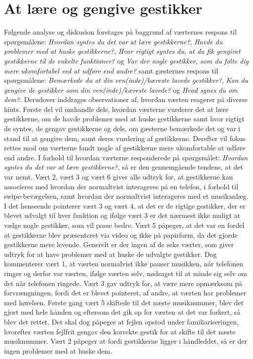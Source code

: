 \section{At lære og gengive gestikker}
\label{TestresultaterSocialAcceptGestikker}
%
Følgende analyse og diskusion foretages på baggrund af værternes respons til spørgsmålene: \textit{Hvordan syntes du det var at lære gestikkerne?}, \textit{Havde du problemer med at huske gestikkerne?}, \textit{Hvor rigtigt syntes du, at du fik gengivet gestikkerne til de enkelte funktioner?} og \textit{Var der nogle gestikker, som du følte dig mere ukomfortabel ved at udføre end andre?} samt gæsternes respons til spørgsmålene: \textit{Bemærkede du at din ven(inde)/kæreste lavede gestikker?}, \textit{Kan du gengive de gestikker som din ven(inde)/kæreste lavede?} og \textit{Hvad synes du om dem?}. Derudover inddrages observationer af, hvordan værten reagerer på diverse hints. Første del vil omhandle dels, hvordan værterne vurderer det at lære gestikkerne, om de havde problemer med at huske gestikkerne samt hvor rigtigt de syntes, de gengav gestikkerne og dels, om gæsterne bemærkede det og var i stand til at gengive dem, samt deres vurdering af gestikkerne. Derefter vil fokus rettes mod om værterne fandt nogle af gestikkerne mere ukomfortable at udføre end andre.\blankline
%
I forhold til hvordan værterne responderede på spørgsmålet: \textit{Hvordan syntes du det var at lære gestikkerne?}, så er den gennemgående tendens, at det var nemt. Vært 2, vært 3 og vært 6 giver alle udtryk for, at gestikkerne kan associeres med hvordan der normaltvist interageres på en telefon, i forhold til swipe-bevægelsen, samt hvordan der normaltvist interageres med et musikanlæg. I det henseende pointerer vært 3 og vært 4, at det er de rigtige gestikker, der er blevet udvalgt til hver funktion og ifølge vært 3 er det nærmest ikke muligt at vælge nogle gestikker, som vil passe bedre. Vært 5 påpeger, at det var en fordel at gestikkerne blev præsenteret via video og ikke på papirform, da det gjorde gestikkerne mere levende. Generelt er der ingen af de seks værter, som giver udtryk for at have problemer med at huske de udvalgte gestikker. Dog kommenterer vært 1, at værten normalvist ikke pauser musikken, når telefonen ringer og derfor var værten, ifølge værten selv, nødsaget til at minde sig selv om det når telefonen ringede. Vært 3 gav udtryk for, at være mere opmærksom på forvrængningen, fordi det er blevet pointeret, af andre, at værten har problemer med hørelsen. Første gang vært 5 skiftede til det næste musiknummer, blev det gjort med hele hånden og eftersom det gik op for værten at det var forkert, så blev det rettet. Det skal dog påpeges at fejlen opstod under familiariseringen, hvorefter værten fejlfrit gengav den korrekte gestik for at skifte til det næste musiknummer. Vært 2 påpeger at fordi gestikkerne ligger i håndleddet, så er der ingen problemer med at huske dem. 

